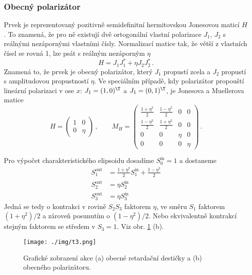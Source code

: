 \subsubsection*{Obecný polarizátor}

Prvek je reprezentovaný pozitivně semidefinitní hermitovskou Jonesovou maticí $H$.
To znamená, že pro ně existují dvě ortogonální vlastní polarizace $J_1$, $J_2$ s reálnými nezápornými vlastními čísly. 
Normalizací matice tak, že větší z vlastních čísel se rovná 1, lze psát s reálným nezáporným $\eta$
\begin{equation}
H=J_1 J_1^* + \eta J_2 J_2^* \,.
\end{equation}
Znamená to, že prvek je obecný polarizátor, který $J_1$ propustí zcela a $J_2$ propustí s amplitudovou propustností $\eta$.
Ve speciálním případě, kdy polarizátor propouští lineární polarizaci v ose $x$: $J_1=(1,0)^\T$ a $J_1=(0,1)^\T$, je Jonesova a Muellerova matice
\begin{equation}
H=\begin{pmatrix}
1 & 0 \\ 0 & \eta
\end{pmatrix} \,, \qquad
M_H=\begin{pmatrix}
\frac{1+\eta^2}{2} & \frac{1-\eta^2}{2} & 0 & 0 \\ \frac{1-\eta^2}{2} & \frac{1+\eta^2}{2} & 0 & 0 \\
0 & 0 & \eta & 0 \\ 0 & 0 & 0 & \eta 
\end{pmatrix} \,.
\end{equation}

Pro výpočet charakteristického elipsoidu dosadíme $S_0^{\textrm{in}}=1$ a dostaneme
\begin{align}
    S_1^{\textrm{out}}&=\frac{1+\eta^2}{2} S_1^{\textrm{in}}+\frac{1-\eta^2}{2} \\
    S_2^{\textrm{out}}&=\eta S_2^{\textrm{in}} \\
    S_3^{\textrm{out}}&=\eta S_3^{\textrm{in}} 
\end{align}
Jedná se tedy o kontrakci v rovině $S_2S_3$ faktorem $\eta$, ve směru $S_1$ faktorem $(1+\eta^2)/2$ a zároveň posunutím o $(1-\eta^2)/2$. 
Nebo ekvivalentně kontrakcí stejným faktorem se středem v $S_3=1$. Viz obr. \ref{f:akce muelleru} (b).

\begin{figure}\centering
\texttt{[image: ./img/t3.png]}
\caption{Grafické zobrazení akce (a) obecné retardační destičky a (b) obecného polarizátoru.}\label{f:akce muelleru}
\end{figure}

